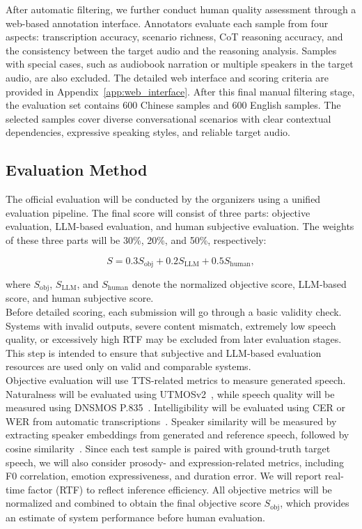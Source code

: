 \documentclass[a4paper]{article}
\begin{document}
\noindent After automatic filtering, we further conduct human quality assessment through a web-based annotation interface. Annotators evaluate each sample from four aspects: transcription accuracy, scenario richness, CoT reasoning accuracy, and the consistency between the target audio and the reasoning analysis.  Samples with special cases, such as audiobook narration or multiple speakers in the target audio, are also excluded. The detailed web interface and scoring criteria are provided in Appendix~\ref{app:web_interface}. After this final manual filtering stage, the evaluation set contains 600 Chinese samples and 600 English samples. The selected samples cover diverse conversational scenarios with clear contextual dependencies, expressive speaking styles, and reliable target audio.

\subsection{Evaluation Method}

The official evaluation will be conducted by the organizers using a unified evaluation pipeline. The final score will consist of three parts: objective evaluation, LLM-based evaluation, and human subjective evaluation. The weights of these three parts will be 30\%, 20\%, and 50\%, respectively:

\begin{equation}
S = 0.3 S_{\mathrm{obj}} + 0.2 S_{\mathrm{LLM}} + 0.5 S_{\mathrm{human}},
\end{equation}

\noindent where $S_{\mathrm{obj}}$, $S_{\mathrm{LLM}}$, and $S_{\mathrm{human}}$ denote the normalized objective score, LLM-based score, and human subjective score.\\

\noindent Before detailed scoring, each submission will go through a basic validity check. Systems with invalid outputs, severe content mismatch, extremely low speech quality, or excessively high RTF may be excluded from later evaluation stages. This step is intended to ensure that subjective and LLM-based evaluation resources are used only on valid and comparable systems.\\

\noindent Objective evaluation will use TTS-related metrics to measure generated speech. Naturalness will be evaluated using UTMOSv2~\cite{baba2024utmosv2}, while speech quality will be measured using DNSMOS P.835~\cite{reddy2022dnsmos}. Intelligibility will be evaluated using CER or WER from automatic transcriptions~\cite{morris2004and}. Speaker similarity will be measured by extracting speaker embeddings from generated and reference speech, followed by cosine similarity~\cite{wang2023wespeaker}. Since each test sample is paired with ground-truth target speech, we will also consider prosody- and expression-related metrics, including F0 correlation, emotion expressiveness, and duration error. We will report real-time factor (RTF) to reflect inference efficiency. All objective metrics will be normalized and combined to obtain the final objective score $S_{\mathrm{obj}}$, which provides an estimate of system performance before human evaluation.\\
\end{document}

